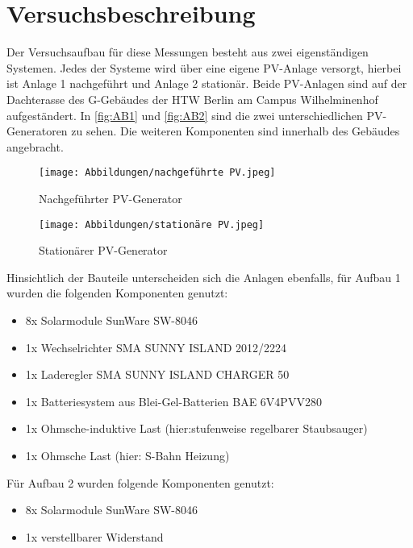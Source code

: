 \section{Versuchsbeschreibung}
\label{section:Versuchsbeschreibung}
Der Versuchsaufbau für diese Messungen besteht aus zwei eigenständigen Systemen.
Jedes der Systeme wird über eine eigene PV-Anlage versorgt, hierbei ist Anlage 1 nachgeführt und Anlage 2 stationär. Beide PV-Anlagen sind auf
der Dachterasse des G-Gebäudes der HTW Berlin am Campus Wilhelminenhof aufgeständert.
In \autoref{fig:AB1}  und \autoref{fig:AB2} sind die zwei unterschiedlichen PV-Generatoren
zu sehen. Die weiteren Komponenten sind innerhalb des Gebäudes angebracht.\\
%
\begin{figure}[H]
	\centering
	\begin{minipage}{0.49\textwidth}
		\centering
		\texttt{[image: Abbildungen/nachgeführte PV.jpeg]}
		\caption{Nachgeführter PV-Generator}	
		\label{fig:AB1}
	\end{minipage}
	\hfill
\begin{minipage}{0.49\textwidth}
	\centering
	\texttt{[image: Abbildungen/stationäre PV.jpeg]}
	\caption{Stationärer PV-Generator}
	\label{fig:AB2}
\end{minipage}
\end{figure}
%
Hinsichtlich der Bauteile unterscheiden sich die Anlagen ebenfalls, für Aufbau 1 
wurden die folgenden Komponenten genutzt:
\begin{itemize}
	\item 8x Solarmodule SunWare SW-8046 
	\item 1x Wechselrichter SMA SUNNY ISLAND 2012/2224 
	\item 1x Laderegler SMA SUNNY ISLAND CHARGER 50 
	\item 1x Batteriesystem aus Blei-Gel-Batterien BAE 6V4PVV280
	\item 1x Ohmsche-induktive Last (hier:stufenweise regelbarer Staubsauger)
	\item 1x Ohmsche Last (hier: S-Bahn Heizung)
\end{itemize}

Für Aufbau 2 wurden folgende Komponenten genutzt:
\begin{itemize}
	\item 8x Solarmodule SunWare SW-8046 
	\item 1x verstellbarer Widerstand
\end{itemize}
